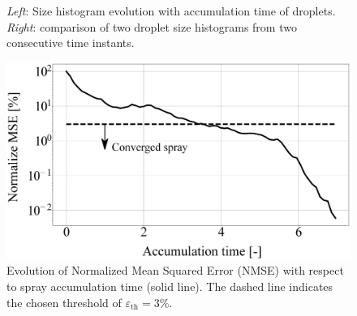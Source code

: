 \begin{figure}[ht]
     \centering
     \begin{subfigure}[b]{0.45\textwidth}
         \centering
     \end{subfigure}
     \begin{subfigure}[b]{0.45\textwidth}
         \centering
     \end{subfigure}
        \caption{\textsl{Left}: Size histogram evolution with accumulation time of droplets. \textsl{Right}: comparison of two droplet size histograms from two consecutive time instants.}
        \label{fig:spray_convergence_description_accumulation_and_MSE_comparison}
\end{figure}




\begin{figure}[h!]
	\centering
	\includegraphics[scale=0.15]{./part2_developments/figures_ch4_SLI/spray_convergence_with_text.eps}
	\caption[Evolution of Normalized Mean Squared Error (NMSE) with respect to spray accumulation time.]{Evolution of Normalized Mean Squared Error (NMSE) with respect to spray accumulation time (solid line). The dashed line indicates the chosen threshold of $\varepsilon_\mathrm{th} = 3 \%$.}
	\label{fig:NMSE_evolution}
\end{figure}



